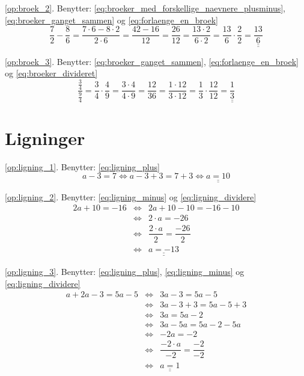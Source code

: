 \documentclass[11pt,a5paper,fleqn,leqno]{book}
\begin{document}
\ref{op:broek_2}. Benytter: \eqref{eq:broeker_med_forskellige_naevnere_plusminus}, \eqref{eq:broeker_ganget_sammen} og \eqref{eq:forlaenge_en_broek}
\[\frac{7}{2} - \frac{8}{6} = \frac{7 \cdot 6 - 8 \cdot 2}{2 \cdot 6} = \frac{42 - 16}{12} = \frac{26}{12} = \frac{13 \cdot 2}{6 \cdot 2} = \frac{13}{6} \cdot \frac{2}{2} = \underline{\underline{\frac{13}{6}}}\]

\ref{op:broek_3}. Benytter: \eqref{eq:broeker_ganget_sammen}, \eqref{eq:forlaenge_en_broek} og \eqref{eq:broeker_divideret}
\[\frac{\frac{3}{4}}{\frac{9}{4}} = \frac{3}{4} \cdot \frac{4}{9} = \frac{3 \cdot 4}{4 \cdot 9} = \frac{12}{36} = \frac{1 \cdot 12}{3 \cdot 12} = \frac{1}{3} \cdot \frac{12}{12} = \underline{\underline{\frac{1}{3}}}\]

\section{Ligninger}

\ref{op:ligning_1}. Benytter: \eqref{eq:ligning_plus}
\[a-3=7 \Leftrightarrow a-3+3=7+3 \Leftrightarrow \underline{\underline{a = 10}}\]

\ref{op:ligning_2}. Benytter: \eqref{eq:ligning_minus} og \eqref{eq:ligning_dividere}
\begin{displaymath}\begin{array}{rcl}
2a+10=-16 & \Leftrightarrow & 2a+10-10=-16-10 \\
          & \Leftrightarrow & 2 \cdot a = -26 \\
          & \Leftrightarrow & \dfrac{2 \cdot a}{2} = \dfrac{-26}{2} \\
          & \Leftrightarrow & \underline{\underline{a = -13}}
\end{array}\end{displaymath}

\ref{op:ligning_3}. Benytter: \eqref{eq:ligning_plus}, \eqref{eq:ligning_minus} og \eqref{eq:ligning_dividere}
\begin{displaymath}\begin{array}{rcl}
a+2a-3 = 5a -5 & \Leftrightarrow & 3a-3 = 5a-5 \\
               & \Leftrightarrow & 3a-3+3 = 5a-5+3 \\
               & \Leftrightarrow & 3a = 5a-2 \\
               & \Leftrightarrow & 3a - 5a = 5a-2-5a \\
               & \Leftrightarrow & -2a = -2 \\
               & \Leftrightarrow & \dfrac{-2 \cdot a}{-2} = \dfrac{-2}{-2} \\
               & \Leftrightarrow & \underline{\underline{a = 1}}
\end{array}\end{displaymath}
\end{document}
